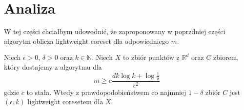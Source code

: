 \section{Analiza}

W tej części chciałbym udowodnić, że zaproponowany w poprzdniej części algorytm oblicza lightweight coreset dla odpowiedniego $m$.

\begin{thm}
    Niech $\epsilon > 0$, $\delta > 0$ oraz $k \in \mathbb{N}$. 
    Niech $X$ to zbiór punktów z $\mathbb{R}^{d}$ oraz $C$ zbiorem, który dostajemy z algorytmu dla
    \begin{equation}
        m \geq c\frac{dk \log{k} + \log{\frac{1}{\delta}}}{\epsilon^2} 
    \end{equation}
    gdzie $c$ to stała. 
    Wtedy z prawdopodobieństwem co najmniej $1-\delta$ zbiór $C$ jest $(\epsilon, k)$ lightweight coresetem dla $X$.
\end{thm}

